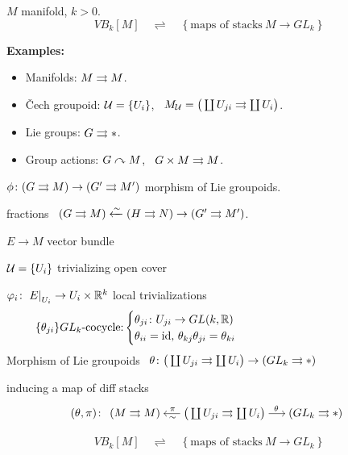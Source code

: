 %
%

\color{red} %

\begin{thm}
  $M$ manifold, $k>0$.
  \[ VB_k[M] \quad \rightleftharpoons \quad \left\{ \text{maps of stacks} \ M\to GL_k \right\} \]
\end{thm}

\textbf{Examples:}
\begin{itemize}
  \item Manifolds: $M\rightrightarrows M$.
  \item \v Cech groupoid: $\mathcal{U}=\{U_i\}$, \ \( M_{\mathcal{U}} = \big( \coprod U_{ji}\rightrightarrows \coprod U_i \big) \).
  \item Lie groups: $G\rightrightarrows *$.
  \item Group actions: $G\curvearrowright M$, \ $G\times M\rightrightarrows M$.
\end{itemize}

$\phi\colon(G\rightrightarrows M)\to(G'\rightrightarrows M')$ morphism of Lie groupoids.

fractions \ $(G\rightrightarrows M) \xleftarrow{\sim} (H\rightrightarrows N) \rightarrow (G'\rightrightarrows M')$.

$E\to M$ vector bundle

$\mathcal{U}=\{U_i\}$ trivializing open cover

$\varphi_i\colon \left.E\right|_{U_i}\to U_i\times\mathbb{R}^k$ local trivializations
\begin{equation*}
  \{\theta_{ji}\} \text{$GL_k$-cocycle:}
  \begin{cases}
    \theta_{ji}\colon U_{ji}\to GL(k,\RR)\\
    \theta_{ii}=\text{id}$, $\theta_{kj}\theta_{ji}=\theta_{ki}
  \end{cases} \qquad\qquad\qquad\qquad\qquad\qquad
\end{equation*}
Morphism of Lie groupoids \ $\theta\colon \big( \coprod U_{ji}\rightrightarrows \coprod U_i \big)\to (GL_k\rightrightarrows *)$

inducing a map of diff stacks
\[ (\theta, \pi)\colon
  \begin{tikzcd}[sep=small]
    (M\tto M) & \big( \coprod U_{ji}\tto \coprod U_i \big) \ar[shorten = -.15em]{l}[pos=.45, sloped, below]{\sim}[pos=.45, sloped, above]{\pi} \ar[shorten = -.15em]{r}[pos=.45]{\theta} & (GL_k\tto *)
  \end{tikzcd}
\]

\[ VB_k[M] \quad \rightleftharpoons \quad \left\{ \text{maps of stacks} \ M\to GL_k \right\} \]

\color{black} %

